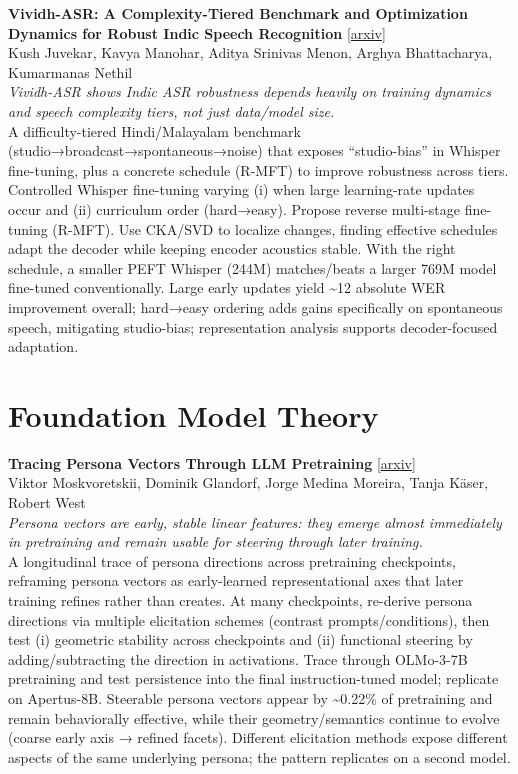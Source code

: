 \documentclass[12pt,letterpaper]{article}
\begin{document}
\medskip

{\small\textbf{Vividh-ASR: A Complexity-Tiered Benchmark and Optimization Dynamics for Robust Indic Speech Recognition}} {\scriptsize[\href{https://arxiv.org/abs/2605.13087}{arxiv}]}\\
{\scriptsize Kush Juvekar, Kavya Manohar, Aditya Srinivas Menon, Arghya Bhattacharya, Kumarmanas Nethil}\\

{\small\textit{Vividh-ASR shows Indic ASR robustness depends heavily on training dynamics and speech complexity tiers, not just data/model size.}}\\[1pt]
{\footnotesize A difficulty-tiered Hindi/Malayalam benchmark (studio→broadcast→spontaneous→noise) that exposes ``studio-bias'' in Whisper fine-tuning, plus a concrete schedule (R-MFT) to improve robustness across tiers. Controlled Whisper fine-tuning varying (i) when large learning-rate updates occur and (ii) curriculum order (hard→easy). Propose reverse multi-stage fine-tuning (R-MFT). Use CKA/SVD to localize changes, finding effective schedules adapt the decoder while keeping encoder acoustics stable. With the right schedule, a smaller PEFT Whisper (244M) matches/beats a larger 769M model fine-tuned conventionally. Large early updates yield \textasciitilde{}12 absolute WER improvement overall; hard→easy ordering adds gains specifically on spontaneous speech, mitigating studio-bias; representation analysis supports decoder-focused adaptation.}

\medskip


\section*{Foundation Model Theory}

{\small\textbf{Tracing Persona Vectors Through LLM Pretraining}} {\scriptsize[\href{https://arxiv.org/abs/2605.13329}{arxiv}]}\\
{\scriptsize Viktor Moskvoretskii, Dominik Glandorf, Jorge Medina Moreira, Tanja K\"aser, Robert West}\\

{\small\textit{Persona vectors are early, stable linear features: they emerge almost immediately in pretraining and remain usable for steering through later training.}}\\[1pt]
{\footnotesize A longitudinal trace of persona directions across pretraining checkpoints, reframing persona vectors as early-learned representational axes that later training refines rather than creates. At many checkpoints, re-derive persona directions via multiple elicitation schemes (contrast prompts/conditions), then test (i) geometric stability across checkpoints and (ii) functional steering by adding/subtracting the direction in activations. Trace through OLMo-3-7B pretraining and test persistence into the final instruction-tuned model; replicate on Apertus-8B. Steerable persona vectors appear by \textasciitilde{}0.22\% of pretraining and remain behaviorally effective, while their geometry/semantics continue to evolve (coarse early axis → refined facets). Different elicitation methods expose different aspects of the same underlying persona; the pattern replicates on a second model.}
\end{document}
